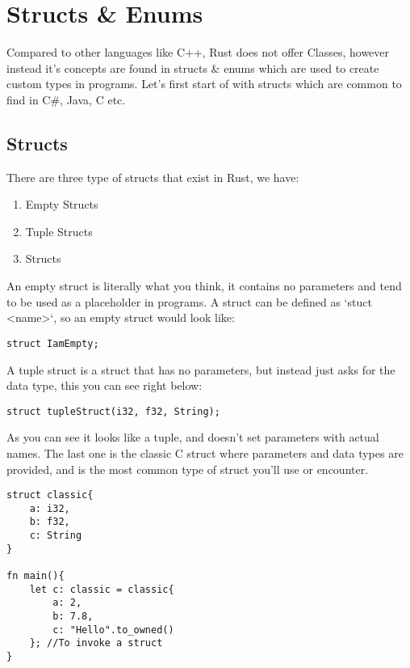 \chapter{Structs \& Enums}

\par Compared to other languages like C++, Rust does not offer Classes, however instead it's concepts are 
found in structs \& enums which are used to create custom types in programs. Let's first start of with structs 
which are common to find in C\#, Java, C etc. 

\section{Structs} 
\par There are three type of structs that exist in Rust, we have: 
\begin{enumerate}
    \item Empty Structs
    \item Tuple Structs
    \item Structs
\end{enumerate}

\par An empty struct is literally what you think, it contains no parameters and tend to be used as a placeholder in programs. A struct can be defined as `stuct <name>`, so an empty struct would look like: 

\begin{lstlisting}
struct IamEmpty;    
\end{lstlisting}

\par A tuple struct is a struct that has no parameters, but instead just asks for the data type, this you can see right below: 

\begin{lstlisting}
struct tupleStruct(i32, f32, String);    
\end{lstlisting}

\par As you can see it looks like a tuple, and doesn't set parameters with actual names.  
The last one is the classic C struct where parameters and data types are provided, and is the most common type of struct you'll use or encounter. 


\begin{lstlisting}
struct classic{
    a: i32, 
    b: f32, 
    c: String
}

fn main(){
    let c: classic = classic{
        a: 2, 
        b: 7.8, 
        c: "Hello".to_owned()
    }; //To invoke a struct
}    
\end{lstlisting}

